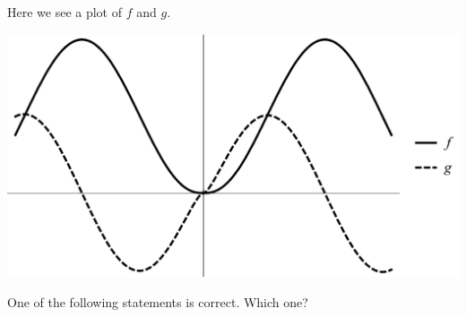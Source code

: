 \documentclass{ximera}
\author{Bart Snapp}
\begin{document}
\begin{exercise}
Here we see a plot of $f$ and $g$. 
\begin{image}
\includegraphics[width=.5\textwidth]{graphFandG5.png}
\end{image}
One of the following statements is correct. Which one?
\begin{multipleChoice}
\end{multipleChoice}
\end{exercise}
\end{document}
